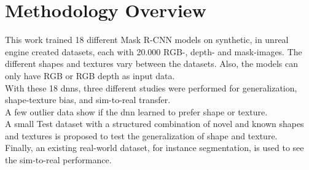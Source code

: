 	
	
	\section{Methodology Overview}
	\label{sec:methodology-overview}
		This work trained 18 different Mask R-CNN \cite{Kaiming2017} models on synthetic, in unreal engine \cite{Romero2022} created datasets, each with 20.000 RGB-, depth- and mask-images. The different shapes and textures vary between the datasets. Also, the models can only have RGB or RGB depth as input data.\\
		With these 18 \ac{dnn}s, three different studies were performed for generalization, shape-texture bias, and sim-to-real transfer.\\
		A few outlier data show if the \ac{dnn} learned to prefer shape or texture.\\
		A small Test dataset with a structured combination of novel and known shapes and textures is proposed to test the generalization of shape and texture.\\
		Finally, an existing real-world dataset, for instance segmentation, is used to see the sim-to-real performance.
		
	
	
